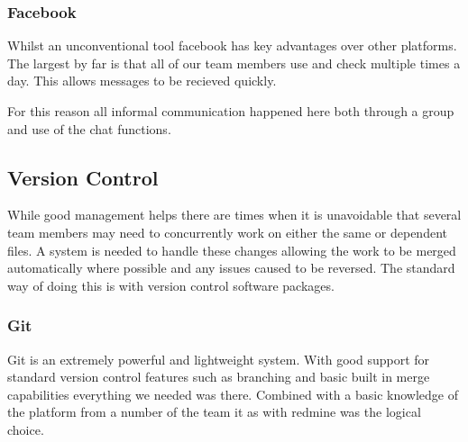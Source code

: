 \subsubsection*{Facebook}

Whilst an unconventional tool facebook has key advantages over other
platforms. The largest by far is that all of our team members use
and check multiple times a day. This allows messages to be recieved
quickly.

For this reason all informal communication happened here both through
a group and use of the chat functions.


\subsection*{Version Control}

While good management helps there are times when it is unavoidable
that several team members may need to concurrently work on either
the same or dependent files. A system is needed to handle these changes
allowing the work to be merged automatically where possible and any
issues caused to be reversed. The standard way of doing this is with
version control software packages.


\subsubsection*{Git}

Git is an extremely powerful and lightweight system. With good support
for standard version control features such as branching and basic
built in merge capabilities everything we needed was there. Combined
with a basic knowledge of the platform from a number of the team it
as with redmine was the logical choice.

